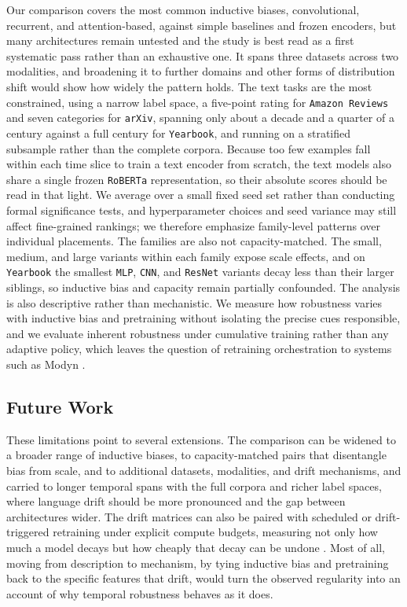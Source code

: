 \tightvspace{-5pt}
Our comparison covers the most common inductive biases, convolutional, recurrent, and attention-based, against simple baselines and frozen encoders, but many architectures remain untested and the study is best read as a first systematic pass rather than an exhaustive one. It spans three datasets across two modalities, and broadening it to further domains and other forms of distribution shift would show how widely the pattern holds. The text tasks are the most constrained, using a narrow label space, a five-point rating for \texttt{Amazon Reviews} and seven categories for \texttt{arXiv}, spanning only about a decade and a quarter of a century against a full century for \texttt{Yearbook}, and running on a stratified subsample rather than the complete corpora. Because too few examples fall within each time slice to train a text encoder from scratch, the text models also share a single frozen \texttt{RoBERTa} representation, so their absolute scores should be read in that light. We average over a small fixed seed set rather than conducting formal significance tests, and hyperparameter choices and seed variance may still affect fine-grained rankings; we therefore emphasize family-level patterns over individual placements. The families are also not capacity-matched. The small, medium, and large variants within each family expose scale effects, and on \texttt{Yearbook} the smallest \texttt{MLP}, \texttt{CNN}, and \texttt{ResNet} variants decay less than their larger siblings, so inductive bias and capacity remain partially confounded. The analysis is also descriptive rather than mechanistic. We measure how robustness varies with inductive bias and pretraining without isolating the precise cues responsible, and we evaluate inherent robustness under cumulative training rather than any adaptive policy, which leaves the question of retraining orchestration to systems such as Modyn \cite{boether_modyn_2025}.

\tightvspace{-5pt}
\subsection{Future Work}

\tightvspace{-5pt}
These limitations point to several extensions. The comparison can be widened to a broader range of inductive biases, to capacity-matched pairs that disentangle bias from scale, and to additional datasets, modalities, and drift mechanisms, and carried to longer temporal spans with the full corpora and richer label spaces, where language drift should be more pronounced and the gap between architectures wider. The drift matrices can also be paired with scheduled or drift-triggered retraining under explicit compute budgets, measuring not only how much a model decays but how cheaply that decay can be undone \cite{mahadevan_cost_aware_2024}. Most of all, moving from description to mechanism, by tying inductive bias and pretraining back to the specific features that drift, would turn the observed regularity into an account of why temporal robustness behaves as it does.

